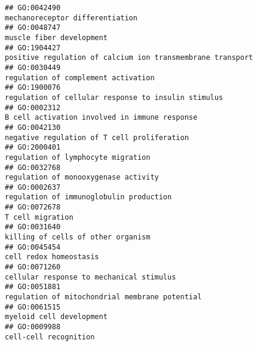 \documentclass[
]{article}
\begin{document}
\begin{verbatim}
## GO:0042490                                                                                                                  mechanoreceptor differentiation
## GO:0048747                                                                                                                         muscle fiber development
## GO:1904427                                                                                       positive regulation of calcium ion transmembrane transport
## GO:0030449                                                                                                              regulation of complement activation
## GO:1900076                                                                                              regulation of cellular response to insulin stimulus
## GO:0002312                                                                                                    B cell activation involved in immune response
## GO:0042130                                                                                                      negative regulation of T cell proliferation
## GO:2000401                                                                                                               regulation of lymphocyte migration
## GO:0032768                                                                                                             regulation of monooxygenase activity
## GO:0002637                                                                                                          regulation of immunoglobulin production
## GO:0072678                                                                                                                                 T cell migration
## GO:0031640                                                                                                               killing of cells of other organism
## GO:0045454                                                                                                                           cell redox homeostasis
## GO:0071260                                                                                                         cellular response to mechanical stimulus
## GO:0051881                                                                                                   regulation of mitochondrial membrane potential
## GO:0061515                                                                                                                         myeloid cell development
## GO:0009988                                                                                                                            cell-cell recognition

\end{verbatim}
\end{document}
